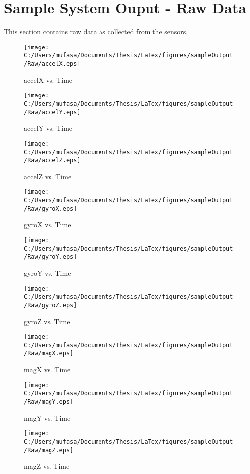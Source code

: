 \section{Sample System Ouput - Raw Data}
This section contains raw data as collected from the sensors.
\begin{figure}[]
	\centering
	\caption{accelX vs. Time}
		\texttt{[image: C:/Users/mufasa/Documents/Thesis/LaTex/figures/sampleOutput/Raw/accelX.eps]}
\end{figure}
\begin{figure}[]
	\centering
	\caption{accelY vs. Time}
		\texttt{[image: C:/Users/mufasa/Documents/Thesis/LaTex/figures/sampleOutput/Raw/accelY.eps]}
\end{figure}
\begin{figure}[]
	\centering
	\caption{accelZ vs. Time}
		\texttt{[image: C:/Users/mufasa/Documents/Thesis/LaTex/figures/sampleOutput/Raw/accelZ.eps]}
\end{figure}
\begin{figure}[]
	\centering
	\caption{gyroX vs. Time}
		\texttt{[image: C:/Users/mufasa/Documents/Thesis/LaTex/figures/sampleOutput/Raw/gyroX.eps]}
\end{figure}
\begin{figure}[]
	\centering
	\caption{gyroY vs. Time}
		\texttt{[image: C:/Users/mufasa/Documents/Thesis/LaTex/figures/sampleOutput/Raw/gyroY.eps]}
\end{figure}
\clearpage
\begin{figure}[]
	\centering
	\caption{gyroZ vs. Time}
		\texttt{[image: C:/Users/mufasa/Documents/Thesis/LaTex/figures/sampleOutput/Raw/gyroZ.eps]}
\end{figure}
\begin{figure}[]
	\centering
	\caption{magX vs. Time}
		\texttt{[image: C:/Users/mufasa/Documents/Thesis/LaTex/figures/sampleOutput/Raw/magX.eps]}
\end{figure}
\begin{figure}[]
	\centering
	\caption{magY vs. Time}
		\texttt{[image: C:/Users/mufasa/Documents/Thesis/LaTex/figures/sampleOutput/Raw/magY.eps]}
\end{figure}
\begin{figure}[]
	\centering
	\caption{magZ vs. Time}
		\texttt{[image: C:/Users/mufasa/Documents/Thesis/LaTex/figures/sampleOutput/Raw/magZ.eps]}
\end{figure}
